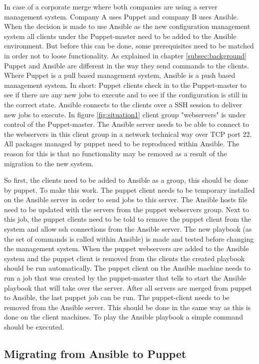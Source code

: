 In case of a corporate merge where both companies are using a server management system. Company A uses Puppet and company B uses Ansible. When the decision is made to use Ansible as the new configuration management system all clients under the Puppet-master need to be added to the Ansible environment. But before this can be done, some prerequisites need to be matched in order not to loose functionality.
As explained in chapter \ref{subsec:background} Puppet and Ansible are different in the way they send commands to the clients. Where Puppet is a pull based management system, Ansible is a push based management system. In short: Puppet clients check in to the Puppet-master to see if there are any new jobs to execute and to see if the configuration is still in the correct state. Ansible connects to the clients over a SSH session to deliver new jobs to execute. In figure \ref{fig:situation1} client group "webservers" is under control of the Puppet-master. The Ansible server needs to be able to connect to the webservers in this client group in a network technical way over TCP port 22. All packages managed by puppet need to be reproduced within Ansible. The reason for this is that no functionality may be removed as a result of the migration to the new system. 

So first, the clients need to be added to Ansible as a group, this should be done by puppet. To make this work. The puppet client needs to be temporary installed on the Ansible server in order to send jobs to this server. The Ansible hosts file need to be updated with the servers from the puppet webservers group. Next to this job, the puppet clients need to be told to remove the puppet client from the system and allow ssh connections from the Ansible server. The new playbook (as the set of commands is called within Ansible) is made and tested before changing the management system. When the puppet webservers are added to the Ansible system and the puppet client is removed from the clients the created playbook should be run automatically. The puppet client on the Ansible machine needs to run a job that was created by the puppet-master that tells to start the Ansible playbook that will take over the server. After all servers are merged from puppet to Ansible, the last puppet job can be run. The puppet-client needs to be removed from the Ansible server. This should be done in the same way as this is done on the client machines. To play the Ansible playbook a simple command should be executed. 


\subsection{Migrating from Ansible to Puppet}\label{subsec:ansibletopuppet}

